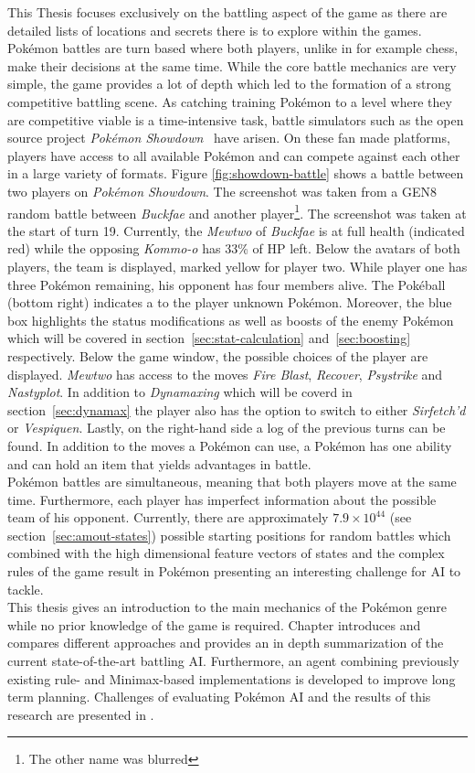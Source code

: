 This Thesis focuses exclusively on the battling aspect of the game as there are detailed lists of locations and
secrets there is to explore within the games. Pokémon battles are turn based where both players, unlike in 
for example chess, make their decisions at the same time. While the core battle mechanics are very simple, 
the game provides a lot of depth which led to the formation of a strong competitive battling scene.
As catching training Pokémon to a level where they are competitive viable is a time-intensive task, battle
simulators such as the open source project \textit{Pokémon Showdown}~\autocite{Showdown:Github} have arisen. On these fan made
platforms, players have access to all available Pokémon and can compete against each other in a large variety
of formats.
Figure \ref{fig:showdown-battle} shows a battle between two players on 
\textit{Pokémon Showdown}. The screenshot was taken from a \ac{GEN8} random battle between 
\textit{Buckfae} and another player\footnote{The other name was blurred}. The screenshot was taken
at the start of turn 19. Currently, the \textit{Mewtwo} of \textit{Buckfae} is at full health (indicated
red) while the opposing \textit{Kommo-o} has 33\% of \ac{HP} left. Below the avatars of both players,
the team is displayed, marked yellow for player two. While player one has three Pokémon remaining,
his opponent has four members alive. The Pokéball (bottom right) indicates a to the player unknown Pokémon.
Moreover, the blue box highlights the status modifications as well as boosts of the enemy Pokémon which will be
covered in section~\ref{sec:stat-calculation} and~\ref{sec:boosting} respectively.
Below the game window, the possible choices of the
player are displayed. \textit{Mewtwo} has access to the moves \textit{Fire Blast}, \textit{Recover}, \textit{Psystrike}
and \textit{Nastyplot}. In addition to \textit{Dynamaxing} which will be coverd in section~\ref{sec:dynamax} the player
also has the option to switch to either \textit{Sirfetch'd} or \textit{Vespiquen}. Lastly,
on the right-hand side a log of the previous turns can be found. In addition to the moves a Pokémon can use,
a Pokémon has one ability and can hold an item that yields advantages in battle. 
\\
Pokémon battles are simultaneous, meaning that both players move at the same time. Furthermore, each player has imperfect
information about the possible team of his opponent. 
Currently, there are approximately $7.9 \times 10^{44}$ 
(see section~\ref{sec:amout-states}) possible
starting positions for random battles which combined with the high dimensional feature vectors of states 
and the complex rules of the game result in Pokémon presenting an interesting challenge for AI to tackle. 
\\
This thesis gives an introduction to the main mechanics of the Pokémon genre while no prior knowledge of the 
game is required. 
Chapter  introduces and compares different approaches and provides an in depth summarization
of the current state-of-the-art battling AI. 
Furthermore, an agent combining previously existing rule- and 
Minimax-based implementations is developed to improve long term planning.
Challenges of evaluating Pokémon AI and the results of this research
are presented in .